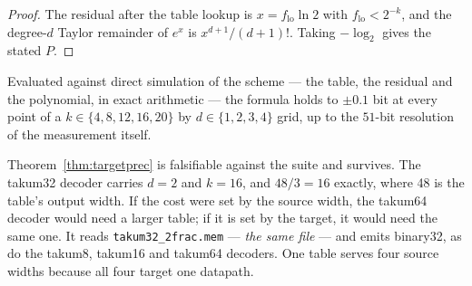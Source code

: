 \documentclass[11pt]{article}
\theoremstyle{definition}
\begin{document}
\begin{proof}
The residual after the table lookup is $x = f_{\mathrm{lo}}\ln 2$ with
$f_{\mathrm{lo}} < 2^{-k}$, and the degree-$d$ Taylor remainder of $e^{x}$ is
$x^{d+1}/(d+1)!$. Taking $-\log_2$ gives the stated $P$.
\end{proof}

Evaluated against direct simulation of the scheme --- the table, the residual and
the polynomial, in exact arithmetic --- the formula holds to $\pm 0.1$ bit at every
point of a $k \in \{4,8,12,16,20\}$ by $d \in \{1,2,3,4\}$ grid, up to the
$51$-bit resolution of the measurement itself.

Theorem~\ref{thm:targetprec} is falsifiable against the suite and survives. The
takum32 decoder carries $d = 2$ and $k = 16$, and $48/3 = 16$ exactly, where 48 is
the table's output width. If the cost were set by the source width, the takum64
decoder would need a larger table; if it is set by the target, it would need the
same one. It reads \texttt{takum32\_2frac.mem} --- \emph{the same file} --- and
emits binary32, as do the takum8, takum16 and takum64 decoders. One table serves
four source widths because all four target one datapath.
\end{document}
